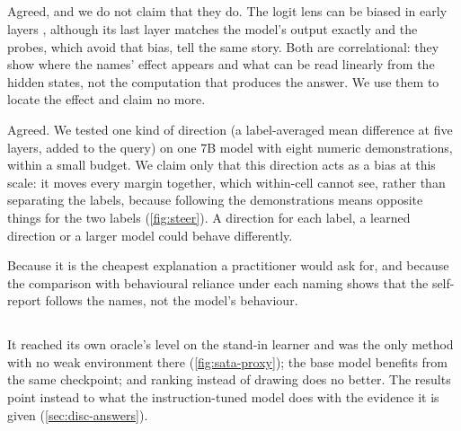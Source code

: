 \subsection*{}


Agreed, and we do not claim that they do. The logit lens can be biased in early layers \citep{belrose2023eliciting}, although its last layer matches the model's output exactly and the probes, which avoid that bias, tell the same story. Both are correlational: they show where the names' effect appears and what can be read linearly from the hidden states, not the computation that produces the answer. We use them to locate the effect and claim no more.


Agreed. We tested one kind of direction (a label-averaged mean difference at five layers, added to the query) on one 7B model with eight numeric demonstrations, within a small budget. We claim only that this direction acts as a bias at this scale: it moves every margin together, which within-cell \AUROC cannot see, rather than separating the labels, because following the demonstrations means opposite things for the two labels (\autoref{fig:steer}). A direction for each label, a learned direction or a larger model could behave differently.


Because it is the cheapest explanation a practitioner would ask for, and because the comparison with behavioural reliance under each naming shows that the self-report follows the names, not the model's behaviour.

\newpage
\subsection*{}

It reached its own oracle's level on the stand-in learner and was the only method with no weak environment there (\autoref{fig:sata-proxy}); the base model benefits from the same checkpoint; and ranking instead of drawing does no better. The results point instead to what the instruction-tuned model does with the evidence it is given (\autoref{sec:disc-answers}).


